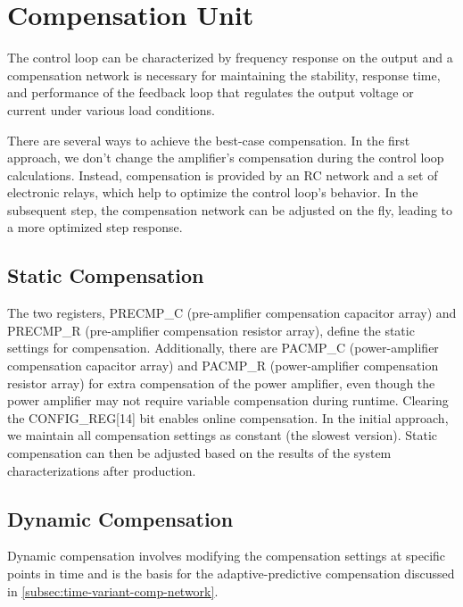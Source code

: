 

\section{Compensation Unit}
\label{sec:compensation-network}

The control loop can be characterized by frequency response on the output and
a compensation network is necessary for maintaining the stability, response
time, and performance of the feedback loop that regulates the output voltage or
current under various load conditions.

There are several ways to achieve the best-case compensation.
In the first approach, we don't change the amplifier's compensation during
the control loop calculations.
Instead, compensation is provided by an RC network and a set of electronic
relays, which help to optimize the control loop's behavior.
In the subsequent step, the compensation network can be adjusted on the fly,
leading to a more optimized step response.

\subsection{Static Compensation}
\label{subsec:static-compensation}

The two registers, PRECMP\_C (pre-amplifier compensation capacitor array) and
PRECMP\_R (pre-amplifier compensation resistor array), define the static
settings for compensation.
Additionally, there are PACMP\_C (power-amplifier compensation capacitor array)
and PACMP\_R (power-amplifier compensation resistor array) for extra
compensation of the power amplifier, even though the power amplifier may not
require variable compensation during runtime.
Clearing the CONFIG\_REG[14] bit enables online compensation.
In the initial approach, we maintain all compensation settings as constant
(the slowest version).
Static compensation can then be adjusted based on the results of the system
characterizations after production.

\subsection{Dynamic Compensation}
\label{subsec:dynamic-compensation}

Dynamic compensation involves modifying the compensation settings at
specific points in time and is the basis for the adaptive-predictive
compensation discussed in \autoref{subsec:time-variant-comp-network}.

